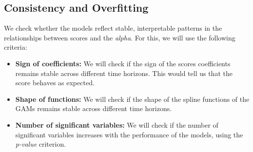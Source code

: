 \documentclass[11pt,english,a4paper,hidelinks]{book}
\begin{document}
\subsection{Consistency and Overfitting}
We check whether the models reflect stable, interpretable patterns in the relationships between scores and the \textit{alpha}. For this, we will use the following criteria:
\begin{itemize}
    \item \textbf{Sign of coefficients:} We will check if the sign of the scores coefficients remains stable across different time horizons. This would tell us that the score behaves as expected. 
    \item \textbf{Shape of functions:} We will check if the shape of the spline functions of the GAMs remains stable across different time horizons. 
    \item \textbf{Number of significant variables:} We will check if the number of significant variables increases with the performance of the models, using the \textit{p-value} criterion.
\end{itemize}
\end{document}
